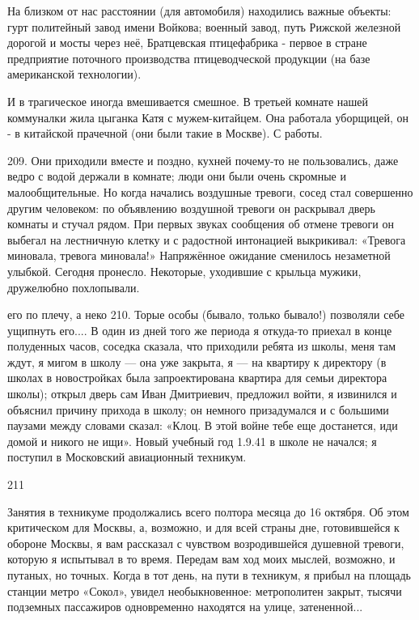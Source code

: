 На близком от нас расстоянии (для автомобиля) находились важные объекты: гурт политейный завод имени Войкова; военный завод, путь Рижской железной дорогой и мосты через неё, Братцевская птицефабрика - первое в стране предприятие поточного производства птицеводческой продукции (на базе американской технологии).

И в трагическое иногда вмешивается смешное. В третьей комнате нашей коммуналки жила цыганка Катя с мужем-китайцем. Она работала уборщицей, он - в китайской прачечной (они были такие в Москве). С работы.

209.
Они приходили вместе и поздно, кухней почему-то не пользовались, даже ведро с водой держали в комнате; люди они были очень скромные и малообщительные. Но когда начались воздушные тревоги, сосед стал совершенно другим человеком: по объявлению воздушной тревоги он раскрывал дверь комнаты и стучал рядом. При первых звуках сообщения об отмене тревоги он выбегал на лестничную клетку и с радостной интонацией выкрикивал: «Тревога миновала, тревога миновала!» Напряжённое ожидание сменилось незаметной улыбкой. Сегодня пронесло. Некоторые, уходившие с крыльца мужики, дружелюбно похлопывали.

его по плечу, а неко 210. Торые особы (бывало, только бывало!) позволяли себе ущипнуть его.... В один из дней того же периода я откуда-то приехал в конце полуденных часов, соседка сказала, что приходили ребята из школы, меня там ждут, я мигом в школу — она уже закрыта, я — на квартиру к директору (в школах в новостройках была запроектирована квартира для семьи директора школы); открыл дверь сам Иван Дмитриевич, предложил войти, я извинился и объяснил причину прихода в школу; он немного призадумался и с большими паузами между словами сказал: «Клоц. В этой войне тебе еще достанется, иди домой и никого не ищи». Новый учебный год 1.9.41 в школе не начался; я поступил в Московский авиационный техникум.

211

Занятия в техникуме продолжались всего полтора месяца до 16 октября. Об этом критическом для Москвы, а, возможно, и для всей страны дне, готовившейся к обороне Москвы, я вам рассказал с чувством возродившейся душевной тревоги, которую я испытывал в то время. Передам вам ход моих мыслей, возможно, и путаных, но точных. Когда в тот день, на пути в техникум, я прибыл на площадь станции метро «Сокол», увидел необыкновенное: метрополитен закрыт, тысячи подземных пассажиров одновременно находятся на улице, затененной...

